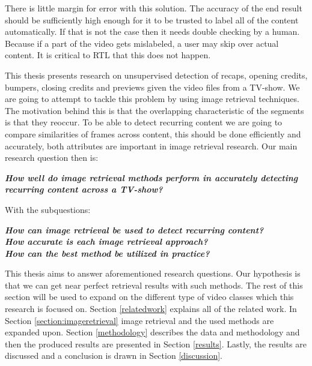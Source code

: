 \documentclass{article}
\begin{document}
There is little margin for error with this solution. The accuracy of the end result should be sufficiently high enough for it to be trusted to label all of the content automatically. If that is not the case then it needs double checking by a human. Because if a part of the video gets mislabeled, a user may skip over actual content. It is critical to RTL that this does not happen.

This thesis presents research on unsupervised detection of recaps, opening credits, bumpers, closing credits and previews given the video files from a TV-show. We are going to attempt to tackle this problem by using image retrieval techniques. The motivation behind this is that the overlapping characteristic of the segments is that they reoccur. To be able to detect recurring content we are going to compare similarities of frames across content, this should be done efficiently and accurately, both attributes are important in image retrieval research. Our main research question then is:
\newline
\begin{adjustwidth}{0.3in}{0.3in}
\textit{\textbf{How well do image retrieval methods perform in accurately detecting recurring content across a TV-show?\newline}}
\end{adjustwidth}
With the subquestions: \\
\begin{adjustwidth}{0.3in}{0.3in}
	\textit{\textbf{How can image retrieval be used to detect recurring content?\newline}}\\
	\textit{\textbf{How accurate is each image retrieval approach?\newline}}\\
	\textit{\textbf{How can the best method be utilized in practice?\newline}}
\end{adjustwidth}
This thesis aims to answer aforementioned research questions. Our hypothesis is that we can get near perfect retrieval results with such methods. The rest of this section will be used to expand on the different type of video classes which this research is focused on. Section \ref{relatedwork} explains all of the related work. In Section \ref{section:imageretrieval} image retrieval and the used methods are expanded upon. Section \ref{methodology} describes the data and methodology and then the produced results are presented in Section \ref{results}. Lastly, the results are discussed and a conclusion is drawn in Section \ref{discussion}.
\end{document}
